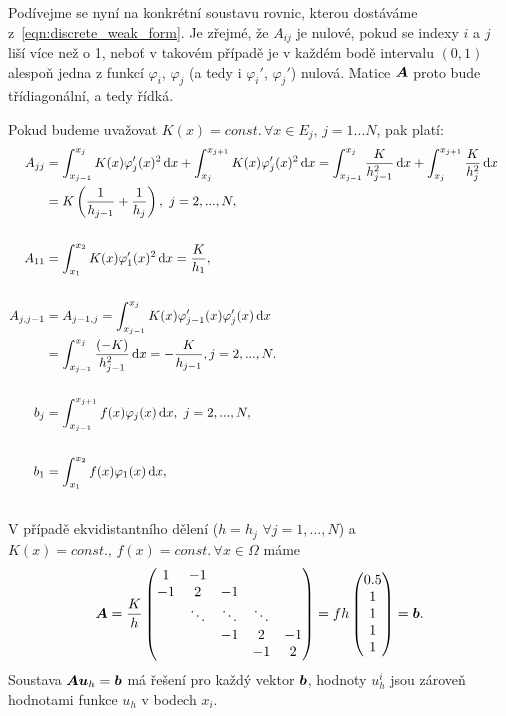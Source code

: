 Podívejme se nyní na konkrétní soustavu rovnic, kterou dostáváme z~\eqref{eqn:discrete_weak_form}.
Je zřejmé, že $A_{ij}$ je nulové, pokud se indexy $i$ a $j$ liší více než o 1, neboť v takovém případě je v každém bodě intervalu $(0,1)$ alespoň jedna z funkcí $\varphi_i$, $\varphi_j$ (a tedy i $\varphi_i'$, $\varphi_j'$) nulová. Matice $\mathbf{\boldsymbol{A}}$ proto bude třídiagonální, a tedy řídká.

Pokud budeme uvažovat $K(x) = const.\, \forall x\in E_j,\, j = 1\ldots N$, pak platí:
\begin{align*}
A_{jj} &= \int_{x_{j-1}}^{x_j} K(x)\varphi_j'(x)^2\,{\rm d} x + \int_{x_j}^{x_{j+1}} K(x) \varphi_j'(x)^2\,{\rm d} x
= \int_{x_{j-1}}^{x_j}\frac{K}{h_{j-1}^2}\,{\rm d} x + \int_{x_j}^{x_{j+1}}\frac{K}{h_j^2}\,{\rm d} x\\
&= K\left(\frac1{h_{j-1}} + \frac1{h_j}\right),~j=2,...,N,\\\\
A_{11} &= \int_{x_1}^{x_{2}} K(x) \varphi_1'(x)^2\,{\rm d} x
= \frac{K}{h_1},&\\\\
A_{j,j-1} &= A_{j-1,j} = \int_{x_{j-1}}^{x_j}K(x)\varphi_{j-1}'(x)\varphi_j'(x)\,{\rm d} x\\
&= \int_{x_{j-1}}^{x_j}\frac{(-K)}{h_{j-1}^2} \,{\rm d} x = -\frac{K}{h_{j-1}}, j=2,...,N.\\\\
b_j &= \int_{x_{j-1}}^{x_{j+1}} f(x)\varphi_j(x)\,{\rm d} x,~j=2,...,N,&\\\\
b_1 &= \int_{x_1}^{x_2} f(x)\varphi_1(x)\,{\rm d} x,&\\\\
\end{align*}
V případě ekvidistantního dělení ($h=h_j$ $\forall j=1,...,N$) a $K(x) = const.,\,f(x)=const.\, \forall x\in\Omega$ máme
\[
  \mathbf{\boldsymbol{A}} = \frac{K}{h}\begin{pmatrix}1 & -1 &&& \\-1 & 2 & -1&&\\&\ddots&\ddots&\ddots&\\&&-1 & 2 & -1\\&&& -1 & 2\end{pmatrix}
  = fh\begin{pmatrix}0.5\\1\\1\\1\\1\end{pmatrix}= \mathbf{\boldsymbol{b}}.
\]
Soustava $\mathbf{\boldsymbol{A}}\mathbf{\boldsymbol{u}}_h=\mathbf{\boldsymbol{b}}$ má řešení pro každý vektor $\mathbf{\boldsymbol{b}}$,
hodnoty $u_h^i$ jsou zároveň hodnotami funkce $u_h$ v bodech $x_i$.




